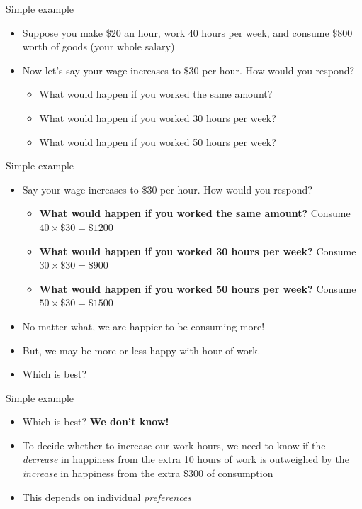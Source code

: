 \documentclass[aspectratio=169]{beamer}
\begin{document}
\begin{frame}{Simple example}
    \begin{itemize}
        \item Suppose you make \$20 an hour, work 40 hours per week, and consume \$800 worth of goods (your whole salary)
        \item Now let's say your wage increases to \$30 per hour. How would you respond?
        \begin{itemize}
            \item What would happen if you worked the same amount?
            \item What would happen if you worked 30 hours per week?
            \item What would happen if you worked 50 hours per week?
        \end{itemize}
    \end{itemize}
\end{frame}

\begin{frame}{Simple example}
    \begin{itemize}
        \item Say your wage increases to \$30 per hour. How would you respond?
        \begin{itemize}
            \item \textbf{What would happen if you worked the same amount?} Consume $40 \times \$30 = \$1200 $
            \item \textbf{What would happen if you worked 30 hours per week?} Consume $30 \times \$30 = \$900 $
            \item \textbf{What would happen if you worked 50 hours per week?} Consume $50 \times \$30 = \$1500 $
        \end{itemize}
        \item No matter what, we are happier to be consuming more!
        \item But, we may be more or less happy with hour of work.
        \item Which is best?
    \end{itemize}
\end{frame}

\begin{frame}{Simple example}
    \begin{itemize}
        \item Which is best? \textbf{We don't know!}
        \item To decide whether to increase our work hours, we need to know if the \textit{decrease} in happiness from the extra 10 hours of work is outweighed by the \textit{increase} in happiness from the extra \$300 of consumption
        \item This depends on individual \textit{preferences}
    \end{itemize}
\end{frame}
\end{document}
